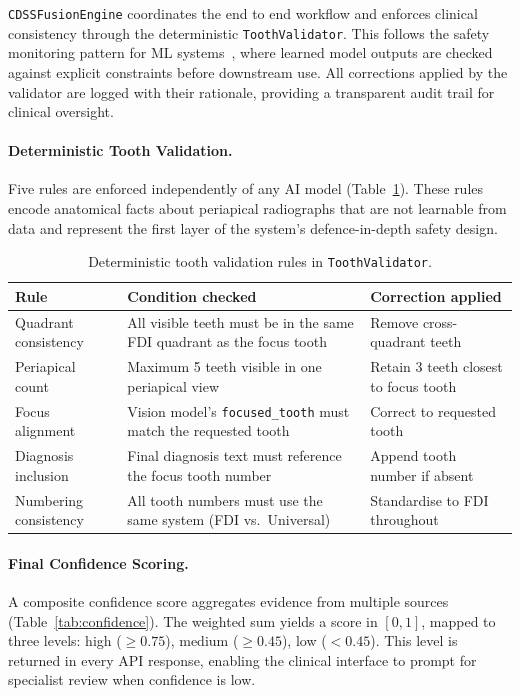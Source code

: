 \documentclass[12pt,a4paper]{report}
\begin{document}
	\texttt{CDSSFusionEngine} coordinates the end to end workflow and enforces clinical
	consistency through the deterministic \texttt{ToothValidator}. This follows the
	safety monitoring pattern for \ac{ML}
	systems~\cite{safety_monitor_ml_perception, amlas_safety_assurance}, where learned model
	outputs are checked against explicit constraints before downstream use. All corrections
	applied by the validator are logged with their rationale, providing a transparent audit
	trail for clinical oversight.
	
	\paragraph{Deterministic Tooth Validation.}
	Five rules are enforced independently of any AI model (Table~\ref{tab:tooth_validator}).
	These rules encode anatomical facts about periapical radiographs that are not learnable
	from data and represent the first layer of the system's defence-in-depth safety design.
	
	\begin{table}[H]
		\centering
		\caption{Deterministic tooth validation rules in \texttt{ToothValidator}.}
		\label{tab:tooth_validator}
		{\small
			\begin{tabular}{p{3.0cm}p{5.0cm}p{3.8cm}}
				\toprule
				\textbf{Rule} & \textbf{Condition checked} & \textbf{Correction applied} \\
				\midrule
				Quadrant consistency
				& All visible teeth must be in the same FDI quadrant as the focus tooth
				& Remove cross-quadrant teeth \\[3pt]
				Periapical count
				& Maximum 5 teeth visible in one periapical view
				& Retain 3 teeth closest to focus tooth \\[3pt]
				Focus alignment
				& Vision model's \texttt{focused\_tooth} must match the requested tooth
				& Correct to requested tooth \\[3pt]
				Diagnosis inclusion
				& Final diagnosis text must reference the focus tooth number
				& Append tooth number if absent \\[3pt]
				Numbering consistency
				& All tooth numbers must use the same system (FDI vs.\ Universal)
				& Standardise to FDI throughout \\
				\bottomrule
			\end{tabular}
		}
	\end{table}
	
	\paragraph{Final Confidence Scoring.}
	A composite confidence score aggregates evidence from multiple sources
	(Table~\ref{tab:confidence}). The weighted sum yields a score in $[0,1]$, mapped to three
	levels: high ($\geq 0.75$), medium ($\geq 0.45$), low ($< 0.45$). This level is returned
	in every API response, enabling the clinical interface to prompt for specialist review when
	confidence is low.
	
\end{document}
